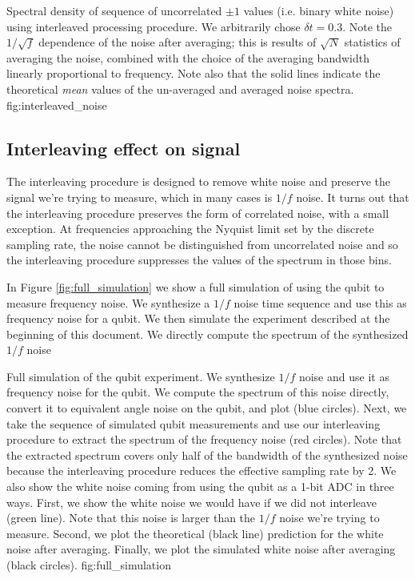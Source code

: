 \documentclass[twocolumn]{article}
\begin{document}
{Spectral density of sequence of uncorrelated $\pm 1$ values (i.e. binary white noise) using interleaved processing procedure.
We arbitrarily chose $\delta t = 0.3$.
Note the $1/\sqrt{f}$ dependence of the noise after averaging; this is results of $\sqrt{N}$ statistics of averaging the noise, combined with the choice of the averaging bandwidth linearly proportional to frequency.
Note also that the solid lines indicate the theoretical \emph{mean} values of the un-averaged and averaged noise spectra.}
{fig:interleaved_noise}

\subsection{Interleaving effect on signal}

The interleaving procedure is designed to remove white noise and preserve the signal we're trying to measure, which in many cases is $1/f$ noise.
It turns out that the interleaving procedure preserves the form of correlated noise, with a small exception.
At frequencies approaching the Nyquist limit set by the discrete sampling rate, the noise cannot be distinguished from uncorrelated noise and so the interleaving procedure suppresses the values of the spectrum in those bins.

In Figure \ref{fig:full_simulation} we show a full simulation of using the qubit to measure frequency noise.
We synthesize a $1/f$ noise time sequence and use this as frequency noise for a qubit.
We then simulate the experiment described at the beginning of this document.
We directly compute the spectrum of the synthesized $1/f$ noise

{Full simulation of the qubit experiment.
We synthesize $1/f$ noise and use it as frequency noise for the qubit.
We compute the spectrum of this noise directly, convert it to equivalent angle noise on the qubit, and plot (blue circles).
Next, we take the sequence of simulated qubit measurements and use our interleaving procedure to extract the spectrum of the frequency noise (red circles).
Note that the extracted spectrum covers only half of the bandwidth of the synthesized noise because the interleaving procedure reduces the effective sampling rate by 2.
We also show the white noise coming from using the qubit as a 1-bit ADC in three ways.
First, we show the white noise we would have if we did not interleave (green line).
Note that this noise is larger than the $1/f$ noise we're trying to measure.
Second, we plot the theoretical (black line) prediction for the white noise after averaging.
Finally, we plot the simulated white noise after averaging (black circles).}
{fig:full_simulation}
\end{document}
